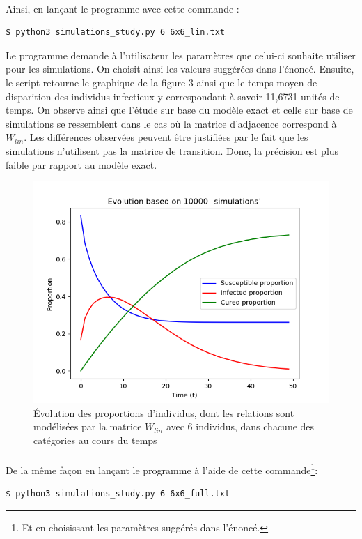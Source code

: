 \documentclass[a4paper, 12pt, oneside]{article}
\begin{document}
\paragraph{}Ainsi, en lançant le programme avec cette commande :

\begin{lstlisting}[language=bash]
$ python3 simulations_study.py 6 6x6_lin.txt 
\end{lstlisting}

\noindent Le programme demande à l'utilisateur les paramètres que celui-ci souhaite utiliser pour les simulations. On choisit ainsi les valeurs suggérées dans l'énoncé. Ensuite, le script retourne le graphique de la figure 3 ainsi que le temps moyen de disparition des individus infectieux y correspondant à savoir 11,6731 unités de temps. On observe ainsi que l'étude sur base du modèle exact et celle sur base de simulations se ressemblent dans le cas où la matrice d'adjacence correspond à $W_{lin}$. Les différences observées peuvent être justifiées par le fait que les simulations n'utilisent pas la matrice de transition. Donc, la précision est plus faible par rapport au modèle exact.

\begin{figure}[H]
	\centering
	\includegraphics[scale=1]{lin_6x6_simulations.png} 
	\caption{Évolution des proportions d'individus, dont les relations sont modélisées par la matrice $W_{lin}$ avec 6 individus, dans chacune des catégories au cours du temps}
\end{figure}

\paragraph{}De la même façon en lançant le programme à l'aide de cette commande\footnote{Et en choisissant les paramètres suggérés dans l'énoncé.}:
\begin{lstlisting}[language=bash]
$ python3 simulations_study.py 6 6x6_full.txt 
\end{lstlisting}
\end{document}
